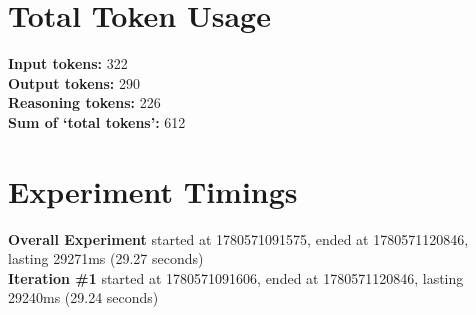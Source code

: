 \documentclass{article}
\begin{document}
\section*{Total Token Usage}
\textbf{Input tokens: }322
\\\textbf{Output tokens: }290
\\\textbf{Reasoning tokens: }226
\\\textbf{Sum of `total tokens': }612
\section*{Experiment Timings}
\textbf{Overall Experiment} started at 1780571091575, ended at 1780571120846, lasting 29271ms (29.27 seconds)
\\\textbf{Iteration \#1} started at 1780571091606, ended at 1780571120846, lasting 29240ms (29.24 seconds)
\end{document}

